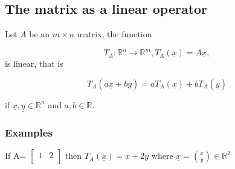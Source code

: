 \documentclass[12pt,a4paper]{article}
\theoremstyle{regla}
\theoremstyle{remark}
\theoremstyle{definition}
\theoremstyle{nonumberbreak}
\begin{document}
\subsection{The matrix as a linear operator}
\begin{fbox}
\begin{minipage}{0.97\textwidth}
Let $A$ be an $m\times  n$ matrix, the function
 
 $$T_A:\mathbb{R}^n\to\mathbb{R}^m, T_A(\underline{x}) = A\underline{x}, $$
is linear, that is
 
$$ T_A (a\underline{x} + b\underline{y}) = aT_A(\underline{x}) + bT_A(\underline{y}) $$
 
 if $ \underline{x}, \underline{y} \in \mathbb{R}^n$ and $a, b \in \mathbb{R}$.
\end{minipage}
\end{fbox}
\subsubsection{Examples}
\begin{xmpl}

 If A=
$\begin{bmatrix}
1 & 2  \\
\end{bmatrix}$ then $T_A(\underline{x}) = x + 2y$ where $ \underline{x} = {x \choose y}\in \mathbb{R}^2$
\end{xmpl}
\end{document}
